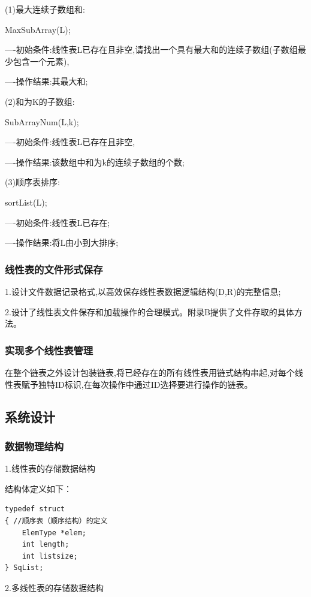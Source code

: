 \documentclass[supercite]{Experimental_Report}
\theoremstyle{definition}
\begin{document}
(1)最大连续子数组和:

MaxSubArray(L); 

----初始条件:线性表L已存在且非空,请找出一个具有最大和的连续子数组(子数组最少包含一个元素),

----操作结果:其最大和;

(2)和为K的子数组:

SubArrayNum(L,k); 

----初始条件:线性表L已存在且非空, 

----操作结果:该数组中和为k的连续子数组的个数;

(3)顺序表排序:

sortList(L);

----初始条件:线性表L已存在;

----操作结果:将L由小到大排序;

\subsubsection{线性表的文件形式保存}

1.设计文件数据记录格式,以高效保存线性表数据逻辑结构(D,{R})的完整信息;

2.设计了线性表文件保存和加载操作的合理模式。附录B提供了文件存取的具体方法。

\subsubsection{实现多个线性表管理}

在整个链表之外设计包装链表,将已经存在的所有线性表用链式结构串起,对每个线性表赋予独特ID标识,在每次操作中通过ID选择要进行操作的链表。

\subsection{系统设计}

\subsubsection{数据物理结构}

1.线性表的存储数据结构

结构体定义如下：

\begin{lstlisting}
typedef struct
{ //顺序表（顺序结构）的定义
    ElemType *elem;
    int length;
    int listsize;
} SqList;
\end{lstlisting}

2.多线性表的存储数据结构
\end{document}
